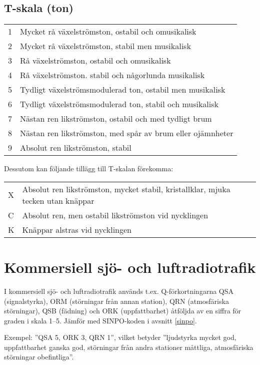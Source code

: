\subsection{T-skala (ton)}

\begin{tabular}{p{}p{}}
1 & Mycket rå växelströmston, ostabil och omusikalisk \\
2 & Mycket rå växelströmston, stabil men musikalisk \\
3 & Rå växelströmston, ostabil och omusikalisk \\
4 & Rå växelströmston. stabil och någorlunda musikalisk \\
5 & Tydligt växelströmsmodulerad ton, ostabil men musikalisk \\
6 & Tydligt växelströmsmodulerad ton, stabil och musikalisk \\
7 & Nästan ren likströmston, ostabil och med tydligt brum \\
8 & Nästan ren likströmston, med spår av brum eller ojämnheter \\
9 & Absolut ren likströmston, stabil \\
\end{tabular}

Dessutom kan följande tillägg till T-skalan förekomma:

\begin{tabular}{p{}p{}}
X & Absolut ren likströmston, mycket stabil, kristallklar, mjuka tecken utan knäppar \\
C & Absolut ren, men ostabil likströmston vid nycklingen \\
K & Knäppar alstras vid nycklingen \\
\end{tabular}

\section{Kommersiell sjö- och luftradiotrafik}

I kommersiell sjö- och luftradiotrafik används t.ex. Q-förkortningarna
QSA (signalstyrka), ORM (störningar från annan station), QRN
(atmosfäriska störningar), QSB (fädning) och ORK (uppfattbarhet)
åtföljda av en siffra för graden i skala 1--5. Jämför med SINPO-koden
i avsnitt \ref{sinpo}.

Exempel:
''QSA 5, ORK 3, QRN 1'', vilket betyder
''ljudstyrka mycket god, uppfattbarhet ganska god, störningar från andra stationer
måttliga, atmosfäriska störningar obefintliga''.


